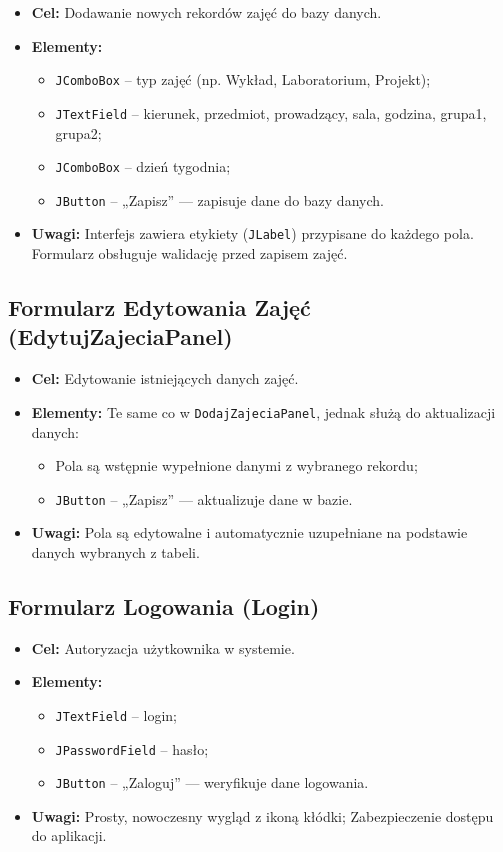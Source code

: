 \begin{itemize}
    \item \textbf{Cel:} Dodawanie nowych rekordów zajęć do bazy danych.
    \item \textbf{Elementy:}
    \begin{itemize}
        \item \texttt{JComboBox} – typ zajęć (np. Wykład, Laboratorium, Projekt);
        \item \texttt{JTextField} – kierunek, przedmiot, prowadzący, sala, godzina, grupa1, grupa2;
        \item \texttt{JComboBox} – dzień tygodnia;
        \item \texttt{JButton} – „Zapisz” — zapisuje dane do bazy danych.
    \end{itemize}
    \item \textbf{Uwagi:} Interfejs zawiera etykiety (\texttt{JLabel}) przypisane do każdego pola. Formularz obsługuje walidację przed zapisem zajęć.
\end{itemize}

\subsection {Formularz Edytowania Zajęć (EdytujZajeciaPanel)}

\begin{itemize}
    \item \textbf{Cel:} Edytowanie istniejących danych zajęć.
    \item \textbf{Elementy:} Te same co w \texttt{DodajZajeciaPanel}, jednak służą do aktualizacji danych:
    \begin{itemize}
        \item Pola są wstępnie wypełnione danymi z wybranego rekordu;
        \item \texttt{JButton} – „Zapisz” — aktualizuje dane w bazie.
    \end{itemize}
    \item \textbf{Uwagi:} Pola są edytowalne i automatycznie uzupełniane na podstawie danych wybranych z tabeli.
\end{itemize}

\subsection {Formularz Logowania (Login)}

\begin{itemize}
    \item \textbf{Cel:} Autoryzacja użytkownika w systemie.
    \item \textbf{Elementy:}
    \begin{itemize}
        \item \texttt{JTextField} – login;
        \item \texttt{JPasswordField} – hasło;
        \item \texttt{JButton} – „Zaloguj” — weryfikuje dane logowania.
    \end{itemize}
    \item \textbf{Uwagi:} Prosty, nowoczesny wygląd z ikoną kłódki; Zabezpieczenie dostępu do aplikacji.
\end{itemize}

